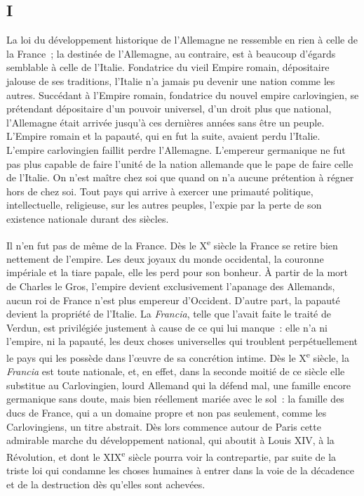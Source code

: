 \documentclass[french,twoside]{book} %
\begin{document}
\subsection[{I}]{I}
\noindent La loi du développement historique de l’Allemagne ne ressemble en rien à celle de la France ; la destinée de l’Allemagne, au contraire, est à beaucoup d’égards semblable à celle de l’Italie. Fondatrice du vieil Empire romain, dépositaire jalouse de ses traditions, l’Italie n’a jamais pu devenir une nation comme les autres. Succédant à l’Empire romain, fondatrice du nouvel empire carlovingien, se prétendant dépositaire d’un pouvoir universel, d’un droit plus que national, l’Allemagne était arrivée jusqu’à ces dernières années sans être un peuple. L’Empire romain et la papauté, qui en fut la suite, avaient perdu l’Italie. L’empire carlovingien faillit perdre l’Allemagne. L’empereur germanique ne fut pas plus capable de faire l’unité de la nation allemande que le pape de faire celle de l’Italie. On n’est maître chez soi que quand on n’a aucune prétention à régner hors de chez soi. Tout pays qui arrive à exercer une primauté politique, intellectuelle, religieuse, sur les autres peuples, l’expie par la perte de son existence nationale durant des siècles.\par
Il n’en fut pas de même de la France. Dès le X\textsuperscript{e} siècle la France se retire bien nettement de l’empire. Les deux joyaux du monde occidental, la couronne impériale et la tiare papale, elle les perd pour son bonheur. À partir de la mort de Charles le Gros, l’empire devient exclusivement l’apanage des Allemands, aucun roi de France n’est plus empereur d’Occident. D’autre part, la papauté devient la propriété de l’Italie. La {\itshape Francia}, telle que l’avait faite le traité de Verdun, est privilégiée justement à cause de ce qui lui manque : elle n’a ni l’empire, ni la papauté, les deux choses universelles qui troublent perpétuellement le pays qui les possède dans l’œuvre de sa concrétion intime. Dès le X\textsuperscript{e} siècle, la {\itshape Francia} est toute nationale, et, en effet, dans la seconde moitié de ce siècle elle substitue au Carlovingien, lourd Allemand qui la défend mal, une famille encore germanique sans doute, mais bien réellement mariée avec le sol : la famille des ducs de France, qui a un domaine propre et non pas seulement, comme les Carlovingiens, un titre abstrait. Dès lors commence autour de Paris cette admirable marche du développement national, qui aboutit à Louis XIV, à la Révolution, et dont le XIX\textsuperscript{e} siècle pourra voir la contrepartie, par suite de la triste loi qui condamne les choses humaines à entrer dans la voie de la décadence et de la destruction dès qu’elles sont achevées.\par
\end{document}
